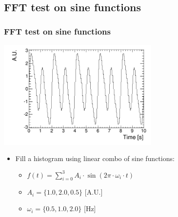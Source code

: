 \documentclass[bigger]{beamer}
\begin{document}
\subsection{FFT test on sine functions}
\label{sec-2-1}
\begin{frame}
\frametitle{FFT test on sine functions}
\label{sec-2-1-1}
\label{sec-2-1-1-1}

\centering
\includegraphics[width=0.6\textwidth]{fig/tutorial_original_histogram.png}
\begin{itemize}

\item Fill a histogram using linear combo of sine functions:
\label{sec-2-1-1-2}%
\begin{itemize}

\item \(f(t) = \sum_{i = 0}^3 A_{i} \cdot \sin (2\pi \cdot \omega_{i} \cdot t)\)
\label{sec-2-1-1-2-1}%

\item \(A_{i} = \{1.0, 2.0, 0.5\}\) [A.U.]
\label{sec-2-1-1-2-2}%

\item \(\omega_{i} = \{0.5, 1.0, 2.0\}\) [Hz]
\label{sec-2-1-1-2-3}%
\end{itemize} %
\end{itemize} %
\end{frame}
\end{document}
